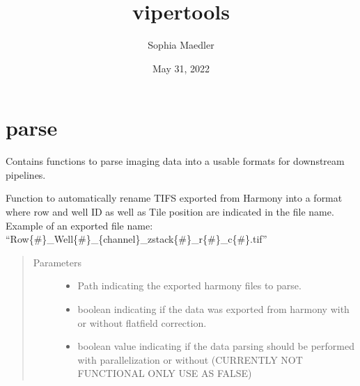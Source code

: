 \documentclass[a4paper,10pt,english,openany,oneside]{sphinxmanual}
\title{vipertools}
\date{May 31, 2022}
\author{Sophia Maedler}
\begin{document}
\pagestyle{empty}
\sphinxmaketitle
\pagestyle{plain}
\sphinxtableofcontents
\pagestyle{normal}
\label{\detokenize{index::doc}}


\chapter{parse}
\label{\detokenize{index:parse}}
\sphinxAtStartPar
Contains functions to parse imaging data into a usable formats for downstream pipelines.

\begin{fulllineitems}
\label{\detokenize{index:vipertools.parse.parse_phenix}}
\sphinxAtStartPar
Function to automatically rename TIFS exported from Harmony into a format where row and well ID as well as Tile position are indicated in the file name.
Example of an exported file name: “Row\{\#\}\_Well\{\#\}\_\{channel\}\_zstack\{\#\}\_r\{\#\}\_c\{\#\}.tif”
\begin{quote}\begin{description}
\item[{Parameters}] \leavevmode\begin{itemize}
\item {} 
\sphinxAtStartPar
{} \textendash{} Path indicating the exported harmony files to parse.

\item {} 
\sphinxAtStartPar
{} \textendash{} boolean indicating if the data was exported from harmony with or without flatfield correction.

\item {} 
\sphinxAtStartPar
{} \textendash{} boolean value indicating if the data parsing should be performed with parallelization or without (CURRENTLY NOT FUNCTIONAL ONLY USE AS FALSE)

\end{itemize}

\end{description}\end{quote}

\end{fulllineitems}
\end{document}
